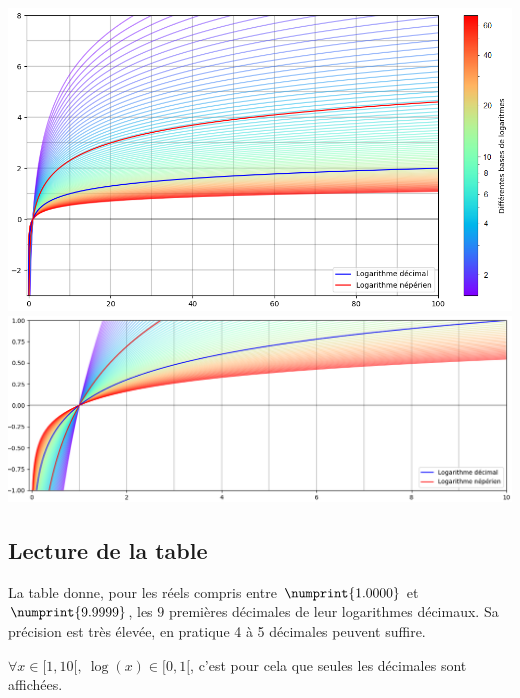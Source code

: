 \documentclass[a4paper, twoside]{article}
\begin{document}
	{\noindent \hspace{0.15cm}\includegraphics[scale=0.6]{log.png}}\\
	\vspace{0.15cm}
	{\noindent \includegraphics[scale=0.5]{log_zoom.png}}

	\newpage

	\subsection{Lecture de la table}

	La table donne, pour les réels compris entre $\numprint{1.0000}$ et $\numprint{9.9999}$, les $9$ premières décimales de leur logarithmes décimaux. Sa précision est très élevée, en pratique 4 à 5 décimales peuvent suffire.

	$\forall x \in [1, 10[,~\log(x) \in [0, 1[$, c'est pour cela que seules les décimales sont affichées.\\
\end{document}
